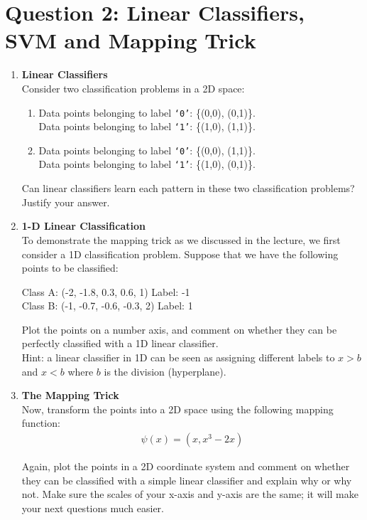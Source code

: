 \documentclass[12pt]{article}
\begin{document}
\section*{Question 2: Linear Classifiers, SVM and Mapping Trick }
\begin{enumerate}
    \item \textbf{Linear Classifiers} \\
    Consider two classification problems in a 2D space:
    \begin{enumerate}
        \item Data points belonging to label \texttt{‘0’}: \{(0,0), (0,1)\}.\\ Data points belonging to label \texttt{‘1’}: \{(1,0), (1,1)\}.
        \item Data points belonging to label \texttt{‘0’}: \{(0,0), (1,1)\}.\\ Data points belonging to label \texttt{‘1’}: \{(1,0), (0,1)\}.
    \end{enumerate}
    Can linear classifiers learn each pattern in these two classification problems? Justify your answer.

    \item \textbf{1-D Linear Classification} \\
    To demonstrate the mapping trick as we discussed in the lecture, we first consider a 1D classification problem.  Suppose that we have the following points to be classified:
    \begin{center}
        Class A: (-2, -1.8, 0.3, 0.6, 1)  Label: -1\\
        Class B: (-1, -0.7, -0.6, -0.3, 2) Label: 1\\
    \end{center}
    Plot the points on a number axis, and comment on whether they can be perfectly classified with a 1D linear classifier.\\
    Hint: a linear classifier in 1D can be seen as assigning different labels to $x>b$ and $x<b$ where $b$ is the division (hyperplane).\\
    
    \item \textbf{The Mapping Trick} \\
    Now, transform the points into a 2D space using the following mapping function:
    \begin{align*}
        \psi(x) = (x, x^3-2x)
    \end{align*}
    \par Again, plot the points in a 2D coordinate system and comment on whether they can be classified with a simple linear classifier and explain why or why not. Make sure the scales of your x-axis and y-axis are the same; it will make your next questions much easier.\\
    

\end{enumerate}
\end{document}
